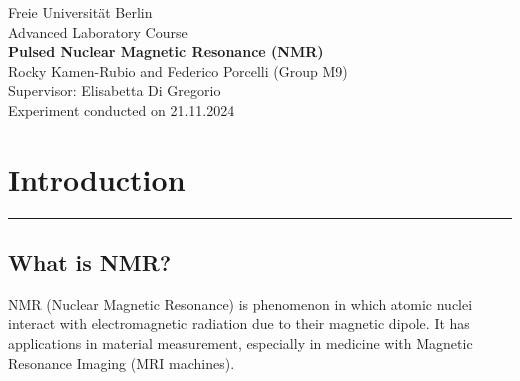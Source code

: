 \documentclass[12pt]{article}
\begin{document}
\begin{center}
\huge{Freie Universität Berlin}\\[10pt]
\huge{Advanced Laboratory Course}\\[50pt]
\huge{\textbf{Pulsed Nuclear Magnetic Resonance (NMR)}}\\[60pt]
\large{Rocky Kamen-Rubio and Federico Porcelli (Group M9)}\\[30pt]
\large{Supervisor: Elisabetta Di Gregorio}\\[30pt]
\large{Experiment conducted on 21.11.2024}\\[30pt]
\end{center}

\begin{abstract}
\justifying (insert abstract)
\end{abstract}

\tableofcontents

\section{Introduction}
\rule{\textwidth}{0.5pt}
\justifying

%
%
%
%
%
%
%
\subsection{What is NMR?}

NMR (Nuclear Magnetic Resonance) is phenomenon in which atomic nuclei interact with electromagnetic radiation due to their magnetic dipole. It has applications in material measurement, especially in medicine with Magnetic Resonance Imaging (MRI machines).
\end{document}
